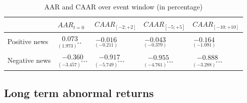 \begin{table}[ht]
\centering
\caption{AAR and CAAR over event window (in percentage)} 
\begin{tabular}{lllll}
   \hline  \hline
  & $AAR_{t=0}$ & $CAAR_{[-2;+2]}$ & $CAAR_{[-5;+5]}$ & $CAAR_{[-10;+10]}$  \\
 \hline
Positive news & $\underset{(1.973)^{**}}{0.073}$  & $\underset{(-0.211)}{-0.016}$    & $\underset{(-0.379)}{-0.043}$ & $\underset{(-1.091)}{-0.164}$  \\ 
Negative news & $\underset{(-3.457)^{***}}{-0.360}$  & $\underset{(-5.749)^{***}}{-0.917}$    & $\underset{(-4.761)^{***}}{-0.955}$ & $\underset{(-3.288)^{***}}{-0.888}$  \\ 
   \hline
\end{tabular}
\label{tab: ST_significace}
\end{table}



\subsection{Long term abnormal returns}


